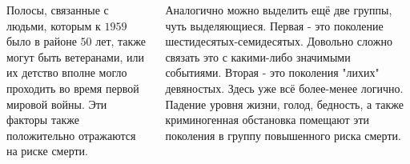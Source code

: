 \documentclass[17pt, a1paper, landscape, margin=0mm, innermargin=10mm,
blockverticalspace=15mm, colspace=10mm, subcolspace=8mm]{tikzposter}
\begin{document}
\begin{columns}
{      \quad Полосы, связанные с людьми, которым к $1959$ было в районе $50$ лет, также могут быть ветеранами, или их детство вполне могло проходить во время первой мировой войны. Эти факторы также положительно отражаются на риске смерти. 
    
      \quad Аналогично можно выделить ещё две группы, чуть выделяющиеся. Первая - это поколение шестидесятых-семидесятых. Довольно сложно связать это с какими-либо значимыми событиями. Вторая - это поколения "лихих" девяностых. Здесь уже всё более-менее логично. Падение уровня жизни, голод, бедность, а также криминогенная обстановка помещают эти поколения в группу повышенного риска смерти. 
    
    
    }    
    

    
\end{columns}
\end{document}
